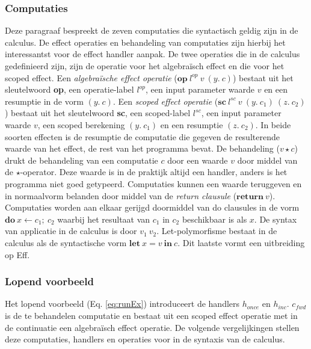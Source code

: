 \subsubsection{Computaties}
Deze paragraaf bespreekt de zeven computaties die syntactisch geldig zijn in de calculus. De effect operaties en behandeling van computaties zijn hierbij het interessantst voor de effect handler aanpak. \newline
De twee operaties die in de calculus gedefinieerd zijn, zijn de operatie voor het algebraïsch effect en die voor het scoped effect. Een \emph{algebraïsche effect operatie} ($\textbf{op} \ l^{op} \ v \ (y. \ c)$) bestaat uit het sleutelwoord \textbf{op}, een operatie-label $l^{op}$, een input parameter waarde $v$ en een resumptie in de vorm $(y. \ c)$. Een \emph{scoped effect operatie} ($\textbf{sc} \ l^{sc} \ v \ (y. \ c_{1}) \ (z. \ c_{2})$) bestaat uit het sleutelwoord \textbf{sc}, een scoped-label $l^{sc}$, een input parameter waarde $v$, een scoped berekening $(y. \ c_{1})$ en een resumptie $(z. \ c_{2})$. In beide soorten effecten is de resumptie de computatie die gegeven de resulterende waarde van het effect, de rest van het programma bevat. \newline  
De behandeling ($v \star c$) drukt de behandeling van een computatie $c$ door een waarde $v$ door middel van de $\star$-operator. Deze waarde is in de praktijk altijd een handler, anders is het programma niet goed getypeerd. \newline 
Computaties kunnen een waarde teruggeven en in normaalvorm belanden door middel van de \emph{return clausule} ($\textbf{return} \ v$). \newline  
Computaties worden aan elkaar gerijgd doormiddel van do clausules in de vorm $\textbf{do} \ x \leftarrow c_{1}; \ c_{2}$ waarbij het resultaat van $c_{1}$ in $c_{2}$ beschikbaar is als $x$. \newline 
De syntax van applicatie in de calculus is door $v_{1}\:v_{2}$. \newline
Let-polymorfisme bestaat in de calculus als de syntactische vorm $\textbf{let}\ 
 x = v \  \textbf{in} \  c$. Dit laatste vormt een uitbreiding op Eff.

\subsubsection{Lopend voorbeeld}
Het lopend voorbeeld (Eq. \ref{eq:runEx}) introduceert de handlers $h_{once}$ en $h_{inc}$. $c_{fwd}$ is de te behandelen computatie en bestaat uit een scoped effect operatie met in de continuatie een algebraïsch effect operatie. De volgende vergelijkingen stellen deze computaties, handlers en operaties voor in de syntaxis van de calculus.

